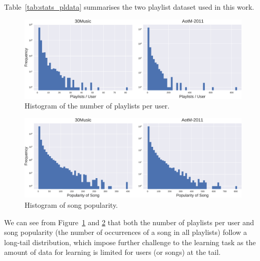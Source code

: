 Table~\ref{tab:stats_pldata} summarises the two playlist dataset used in this work.
%
\begin{table}[!h]
\centering
\caption{Music playlist dataset}
\label{tab:stats_pldata}
\end{table}


\begin{figure}[h]
\centering
\includegraphics[width=\linewidth]{fig/hist_pluser.pdf}
\caption{Histogram of the number of playlists per user.}
\label{fig:hist_pluser}
\end{figure}

\begin{figure}[h]
\centering
\includegraphics[width=\linewidth]{fig/hist_songpop.pdf}
\caption{Histogram of song popularity.}
\label{fig:hist_songpop}
\end{figure}

We can see from Figure~\ref{fig:hist_pluser} and \ref{fig:hist_songpop} that both the number
of playlists per user and song popularity (\ie the number of occurrences of a song in all playlists)
follow a long-tail distribution, which impose further challenge to the learning task as the amount
of data for learning is limited for users (or songs) at the tail.

